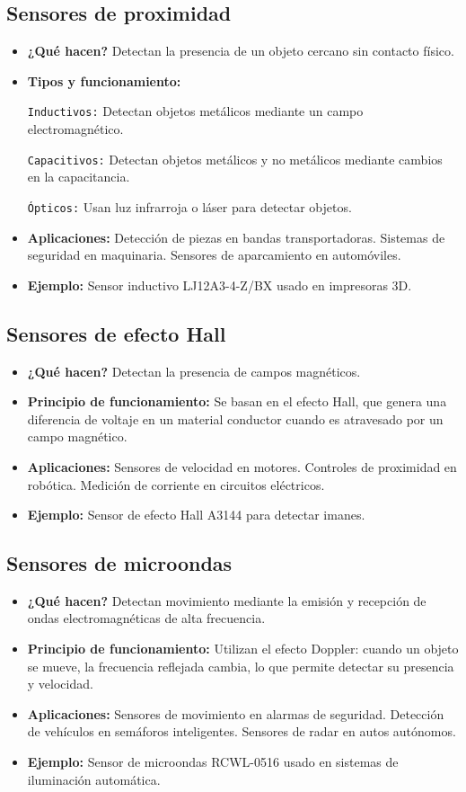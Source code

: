 \subsection*{Sensores de proximidad}
\begin{itemize}
	\item \textbf{¿Qué hacen?} Detectan la presencia de un objeto cercano sin contacto físico.
	\item \textbf{Tipos y funcionamiento:}
	
	\texttt{Inductivos:} Detectan objetos metálicos mediante un campo electromagnético.
	
	\texttt{Capacitivos:} Detectan objetos metálicos y no metálicos mediante cambios en la capacitancia.
	
	\texttt{Ópticos:} Usan luz infrarroja o láser para detectar objetos.
	\item \textbf{Aplicaciones:} Detección de piezas en bandas transportadoras.
	Sistemas de seguridad en maquinaria.
	Sensores de aparcamiento en automóviles.
	\item \textbf{Ejemplo:} Sensor inductivo LJ12A3-4-Z/BX usado en impresoras 3D.
\end{itemize}
\subsection*{Sensores de efecto Hall}
\begin{itemize}
	\item \textbf{¿Qué hacen?} Detectan la presencia de campos magnéticos.
	\item \textbf{Principio de funcionamiento:} Se basan en el efecto Hall, que genera una diferencia de voltaje en un material conductor cuando es atravesado por un campo magnético.
	\item \textbf{Aplicaciones:} Sensores de velocidad en motores.
	Controles de proximidad en robótica.
	Medición de corriente en circuitos eléctricos.
	\item \textbf{Ejemplo:} Sensor de efecto Hall A3144 para detectar imanes.
\end{itemize}
\subsection*{Sensores de microondas}
\begin{itemize}
	\item \textbf{¿Qué hacen?} Detectan movimiento mediante la emisión y recepción de ondas electromagnéticas de alta frecuencia.
	\item \textbf{Principio de funcionamiento:} Utilizan el efecto Doppler: cuando un objeto se mueve, la frecuencia reflejada cambia, lo que permite detectar su presencia y velocidad.
	\item \textbf{Aplicaciones:} Sensores de movimiento en alarmas de seguridad.
	Detección de vehículos en semáforos inteligentes.
	Sensores de radar en autos autónomos.
	\item \textbf{Ejemplo:} Sensor de microondas RCWL-0516 usado en sistemas de iluminación automática.
\end{itemize}
